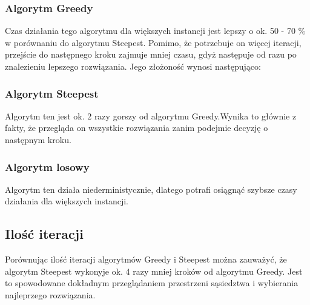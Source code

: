 \subsubsection{Algorytm Greedy}

Czas działania tego algorytmu dla większych instancji jest lepszy o ok. 50 - 70 \% w porównaniu 
do algorytmu Steepest. Pomimo, że potrzebuje on więcej iteracji, przejście do następnego kroku 
zajmuje mniej czasu, gdyż następuje od razu po znalezieniu lepszego rozwiązania. Jego złożoność 
wynosi następująco:

\subsubsection{Algorytm Steepest}

Algorytm ten jest ok. 2 razy gorszy od algorytmu Greedy.Wynika to głównie z fakty, że przegląda on
wszystkie rozwiązania zanim podejmie decyzję o następnym kroku. 

\subsubsection{Algorytm losowy}

Algorytm ten działa niederministycznie, dlatego potrafi osiągnąć szybsze czasy działania dla 
większych instancji. 

\subsection{Ilość iteracji}

Porównując ilość iteracji algorytmów Greedy i Steepest można zauważyć, że algorytm 
Steepest wykonyje ok. 4 razy mniej kroków od algorytmu Greedy. Jest to spowodowane 
dokładnym przeglądaniem przestrzeni sąsiedztwa i wybierania najleprzego rozwiązania.
